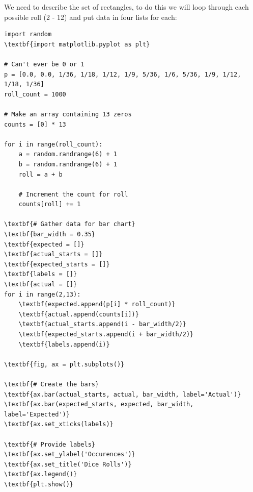 We need to describe the set of rectangles, to do this we will loop through each possible roll (2 - 12) and put data in four lists for each:
\begin{Verbatim}[commandchars=\\\{\}]
import random
\textbf{import matplotlib.pyplot as plt}

# Can't ever be 0 or 1
p = [0.0, 0.0, 1/36, 1/18, 1/12, 1/9, 5/36, 1/6, 5/36, 1/9, 1/12, 1/18, 1/36]
roll_count = 1000

# Make an array containing 13 zeros
counts = [0] * 13

for i in range(roll_count):
    a = random.randrange(6) + 1
    b = random.randrange(6) + 1
    roll = a + b

    # Increment the count for roll
    counts[roll] += 1

\textbf{# Gather data for bar chart}
\textbf{bar_width = 0.35}
\textbf{expected = []}
\textbf{actual_starts = []}
\textbf{expected_starts = []}
\textbf{labels = []}
\textbf{actual = []}
for i in range(2,13):
    \textbf{expected.append(p[i] * roll_count)}
    \textbf{actual.append(counts[i])}      
    \textbf{actual_starts.append(i - bar_width/2)}
    \textbf{expected_starts.append(i + bar_width/2)}
    \textbf{labels.append(i)}
    
\textbf{fig, ax = plt.subplots()}
    
\textbf{# Create the bars}
\textbf{ax.bar(actual_starts, actual, bar_width, label='Actual')}
\textbf{ax.bar(expected_starts, expected, bar_width, label='Expected')}
\textbf{ax.set_xticks(labels)}

\textbf{# Provide labels}
\textbf{ax.set_ylabel('Occurences')}
\textbf{ax.set_title('Dice Rolls')}
\textbf{ax.legend()}
\textbf{plt.show()}
\end{Verbatim}


